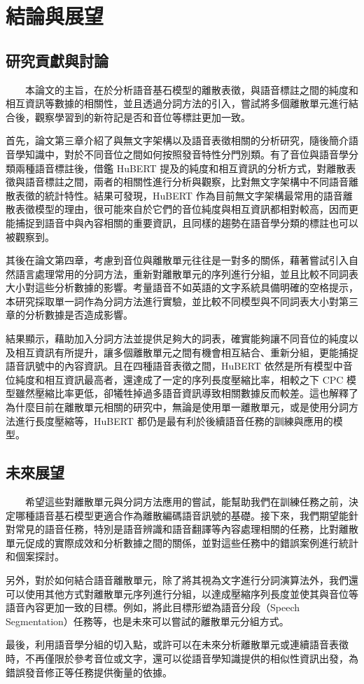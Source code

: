 \chapter{結論與展望}

\section{研究貢獻與討論}

　　本論文的主旨，在於分析語音基石模型的離散表徵，與語音標註之間的純度和相互資訊等數據的相關性，並且透過分詞方法的引入，嘗試將多個離散單元進行結合後，觀察學習到的新符記是否和音位等標註更加一致。 

        首先，論文第三章介紹了與無文字架構以及語音表徵相關的分析研究，隨後簡介語音學知識中，對於不同音位之間如何按照發音特性分門別類。有了音位與語音學分類兩種語音標註後，借鑑 HuBERT 提及的純度和相互資訊的分析方式，對離散表徵與語音標註之間，兩者的相關性進行分析與觀察，比對無文字架構中不同語音離散表徵的統計特性。結果可發現，HuBERT 作為目前無文字架構最常用的語音離散表徵模型的理由，很可能來自於它們的音位純度與相互資訊都相對較高，因而更能捕捉到語音中與內容相關的重要資訊，且同樣的趨勢在語音學分類的標註也可以被觀察到。

        其後在論文第四章，考慮到音位與離散單元往往是一對多的關係，藉著嘗試引入自然語言處理常用的分詞方法，重新對離散單元的序列進行分組，並且比較不同詞表大小對這些分析數據的影響。考量語音不如英語的文字系統具備明確的空格提示，本研究採取單一詞作為分詞方法進行實驗，並比較不同模型與不同詞表大小對第三章的分析數據是否造成影響。

        結果顯示，藉助加入分詞方法並提供足夠大的詞表，確實能夠讓不同音位的純度以及相互資訊有所提升，讓多個離散單元之間有機會相互結合、重新分組，更能捕捉語音訊號中的內容資訊。且在四種語音表徵之間，HuBERT 依然是所有模型中音位純度和相互資訊最高者，還達成了一定的序列長度壓縮比率，相較之下 CPC 模型雖然壓縮比率更低，卻犧牲掉過多語音資訊導致相關數據反而較差。這也解釋了為什麼目前在離散單元相關的研究中，無論是使用單一離散單元，或是使用分詞方法進行長度壓縮等，HuBERT 都仍是最有利於後續語音任務的訓練與應用的模型。

\section{未來展望}

　　希望這些對離散單元與分詞方法應用的嘗試，能幫助我們在訓練任務之前，決定哪種語音基石模型更適合作為離散編碼語音訊號的基礎。接下來，我們期望能針對常見的語音任務，特別是語音辨識和語音翻譯等內容處理相關的任務，比對離散單元促成的實際成效和分析數據之間的關係，並對這些任務中的錯誤案例進行統計和個案探討。

        另外，對於如何結合語音離散單元，除了將其視為文字進行分詞演算法外，我們還可以使用其他方式對離散單元序列進行分組，以達成壓縮序列長度並使其與音位等語音內容更加一致的目標。例如，將此目標形塑為語音分段（Speech Segmentation）任務等，也是未來可以嘗試的離散單元分組方式。

        最後，利用語音學分組的切入點，或許可以在未來分析離散單元或連續語音表徵時，不再僅限於參考音位或文字，還可以從語音學知識提供的相似性資訊出發，為錯誤發音修正等任務提供衡量的依據。
